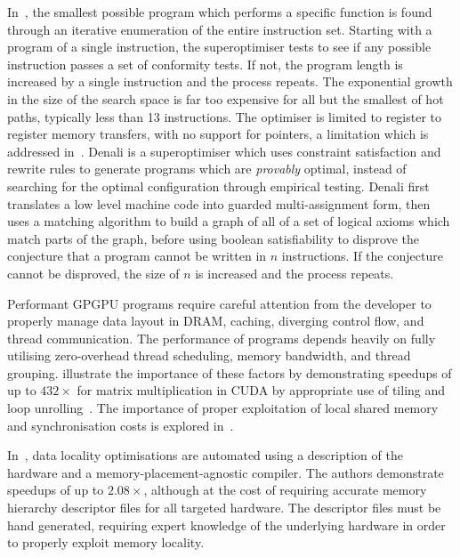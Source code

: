 In~\cite{Massalin1987}, the smallest possible program which performs a specific function is found through an iterative enumeration of the entire instruction set. Starting with a program of a single instruction, the superoptimiser tests to see if any possible instruction passes a set of conformity tests. If not, the program length is increased by a single instruction and the process repeats. The exponential growth in the size of the search space is far too expensive for all but the smallest of hot paths, typically less than 13 instructions. The optimiser is limited to register to register memory transfers, with no support for pointers, a limitation which is addressed in~\cite{Joshi2002}. Denali is a superoptimiser which uses constraint satisfaction and rewrite rules to generate programs which are \emph{provably} optimal, instead of searching for the optimal configuration through empirical testing. Denali first translates a low level machine code into guarded multi-assignment form, then uses a matching algorithm to build a graph of all of a set of logical axioms which match parts of the graph, before using boolean satisfiability to disprove the conjecture that a program cannot be written in $n$ instructions. If the conjecture cannot be disproved, the size of $n$ is increased and the process repeats.

Performant GPGPU programs require careful attention from the developer to properly manage data layout in DRAM, caching, diverging control flow, and thread communication. The performance of programs depends heavily on fully utilising zero-overhead thread scheduling, memory bandwidth, and thread grouping. \citeauthor{Ryoo2008a} illustrate the importance of these factors by demonstrating speedups of up to $432\times$ for matrix multiplication in CUDA by appropriate use of tiling and loop unrolling~\cite{Ryoo2008a}. The importance of proper exploitation of local shared memory and synchronisation costs is explored in~\cite{Lee2010}.

In~\cite{Chen2014}, data locality optimisations are automated using a description of the hardware and a memory-placement-agnostic compiler. The authors demonstrate speedups of up to $2.08\times$, although at the cost of requiring accurate memory hierarchy descriptor files for all targeted hardware. The descriptor files must be hand generated, requiring expert knowledge of the underlying hardware in order to properly exploit memory locality.

